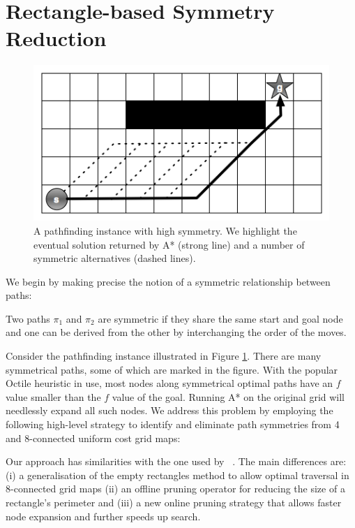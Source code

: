 \section{Rectangle-based Symmetry Reduction}
\label{sec:rsr}

\begin{figure}[]
       \begin{center}
                       \includegraphics[scale=0.36]{diagrams/symmetry_example.png}
       \end{center}
       \caption{A pathfinding instance with high symmetry. We highlight the
eventual solution returned by A* (strong line) and a number of symmetric 
alternatives (dashed lines).}
       \label{fig-symmetry}
		\vspace{-0.5em}
\end{figure}

We begin by making precise the notion of a symmetric relationship between paths:
\begin{definition}
Two paths $\pi_{1}$ and $\pi_{2}$ are symmetric if they share the same start and
goal node and one can be derived from the other by interchanging the order of the
moves.
\end{definition}

Consider the pathfinding instance illustrated in Figure \ref{fig-symmetry}.
There are many symmetrical paths, some of which are marked in the figure.  With
the popular Octile heuristic in use, most nodes along symmetrical optimal paths
have an $f$ value smaller than the $f$ value of the goal.  Running A* on the
original grid will needlessly expand all such nodes.  We address this problem by
employing the following high-level strategy to identify and eliminate path
symmetries from 4 and 8-connected uniform cost grid maps:


Our approach has similarities with the one used by
\citeauthor{harabor10}~.  The main differences are: (i) a
generalisation of the empty rectangles method to allow optimal traversal in
8-connected grid maps (ii) an offline pruning operator for reducing the size of
a rectangle's perimeter and (iii) a new online pruning strategy that allows faster
node expansion and further speeds up search.

